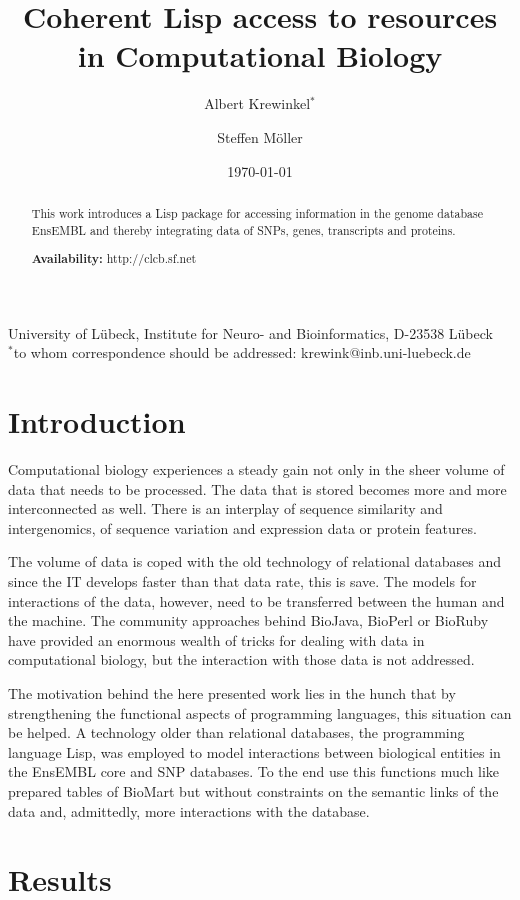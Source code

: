 \documentclass{article}
\author{Albert Krewinkel$^*$ \and Steffen M{\"{o}}ller}
\title{Coherent Lisp access to resources in Computational Biology}
\date{\today}
\begin{document}
\maketitle
{\small University of L{\"{u}}beck, Institute for Neuro- and Bioinformatics, D-23538 L\"ubeck\\

$^*$to whom correspondence should be addressed: krewink@inb.uni-luebeck.de
}
\begin{abstract}
This work introduces a Lisp package for accessing information in the
genome database EnsEMBL and thereby integrating data of SNPs, genes,
transcripts and proteins.

{\bf Availability:} http://clcb.sf.net
\end{abstract}

\section{Introduction}

Computational biology experiences a steady gain not only in the sheer
volume of data that needs to be processed. The data that is stored becomes
more and more interconnected as well. There is an interplay of sequence
similarity and intergenomics, of sequence variation and expression data
or protein features.

The volume of data is coped with the old technology of relational
databases and since the IT develops faster than that data rate, this
is save. The models for interactions of the data, however, need to be
transferred between the human and the machine. The community approaches
behind BioJava, BioPerl or BioRuby have provided an enormous wealth of
tricks for dealing with data in computational biology, but the interaction
with those data is not addressed.

The motivation behind the here presented work lies in the hunch that
by strengthening the functional aspects of programming languages, this
situation can be helped.  A technology older than relational databases,
the programming language Lisp, was employed to model interactions
between biological entities in the EnsEMBL core and SNP databases. To
the end use this functions much like prepared tables of BioMart but
without constraints on the semantic links of the data and, admittedly,
more interactions with the database.

\section{Results}
\end{document}
